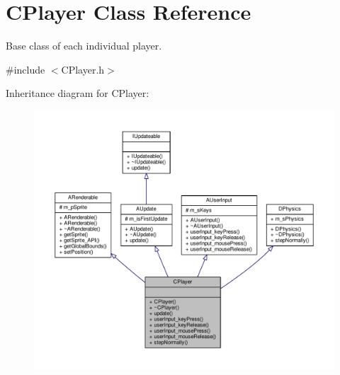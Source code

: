 \hypertarget{classCPlayer}{\section{C\-Player Class Reference}
\label{classCPlayer}
}


Base class of each individual player.  




{\ttfamily \#include $<$C\-Player.\-h$>$}



Inheritance diagram for C\-Player\-:
\nopagebreak
\begin{figure}[H]
\begin{center}
\leavevmode
\includegraphics[width=350pt]{classCPlayer__inherit__graph}
\end{center}
\end{figure}


